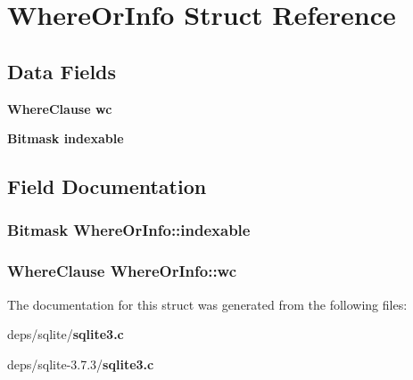 \section{Where\-Or\-Info Struct Reference}
\label{structWhereOrInfo}
\subsection*{Data Fields}
\begin{CompactItemize}
\item 
\bf{Where\-Clause} \bf{wc}
\item 
\bf{Bitmask} \bf{indexable}
\end{CompactItemize}


\subsection{Field Documentation}
\subsubsection{\setlength{\rightskip}{0pt plus 5cm}\bf{Bitmask} \bf{Where\-Or\-Info::indexable}}\label{structWhereOrInfo_0f66b2b351c346c8951190f1e0969bab}


\subsubsection{\setlength{\rightskip}{0pt plus 5cm}\bf{Where\-Clause} \bf{Where\-Or\-Info::wc}}\label{structWhereOrInfo_227bfde350d306d234960e619221ea01}




The documentation for this struct was generated from the following files:\begin{CompactItemize}
\item 
deps/sqlite/\bf{sqlite3.c}\item 
deps/sqlite-3.7.3/\bf{sqlite3.c}\end{CompactItemize}
